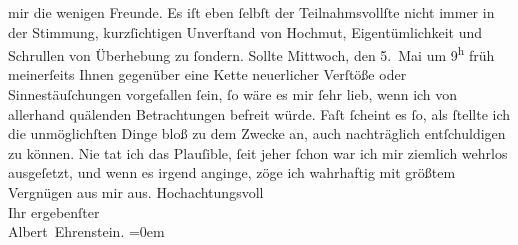 \begin{ledgroupsized}[t]{13cm}
               mir die wenigen Freunde. Es iſt eben ſelbſt der Teilnahmsvollſte nicht immer in der
               Stimmung, kurzſichtigen Unverſtand von Hochmut, Eigentümlichkeit und Schrullen von
               Überhebung zu ſondern. Sollte Mittwoch, den 5. Mai um 9\textsuperscript{h} früh meinerſeits Ihnen gegenüber eine Kette
               neuerlicher Verſtöße oder Sinnestäuſchungen vorgefallen ſein, ſo wäre es mir ſehr
               lieb, wenn ich von allerhand quälenden Betrachtungen befreit würde. Faſt ſcheint es
               ſo, als ſtellte ich die unmöglichſten Dinge bloß zu dem Zwecke an, auch nachträglich
               entſchuldigen zu können. Nie tat ich das Plauſible, ſeit jeher ſchon war ich mir
               ziemlich wehrlos ausgeſetzt, und wenn es irgend anginge, zöge ich {\pb}wahrhaftig mit größtem Vergnügen aus mir
               aus.\pend
           \pstart
           Hochachtungsvoll{\\[\baselineskip]}Ihr ergebenſter{\\[\baselineskip]}\spacefill\mbox{Albert Ehrenstein.}\pend
           \leftskip=0em{}
         
         \endnumbering{}\end{ledgroupsized}  \newcommand{\dateiname}{L01840}\newcommand{\titel}{Albert Ehrenstein an Arthur Schnitzler, 6. 5. 1909}\newcommand{\editorInnen}{Martin Anton Müller und Gerd-Hermann Susen}
      